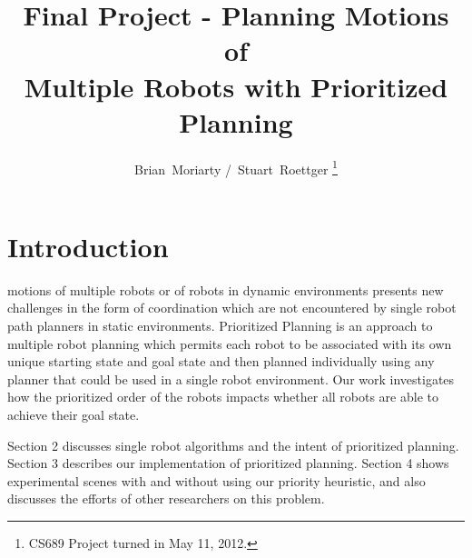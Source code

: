 \documentclass[12pt,journal,compsoc]{IEEEtran}
\begin{document}
%
\title{\large Final Project - Planning Motions of \\ Multiple Robots with Prioritized Planning}

\author{\small Brian~Moriarty
        /~Stuart~Roettger%
\thanks{CS689 Project turned in May 11, 2012.}}

\maketitle

\IEEEdisplaynotcompsoctitleabstractindextext


\IEEEpeerreviewmaketitle


\section{Introduction}
 motions of multiple robots or of robots in dynamic environments presents new challenges in the form of coordination which are not encountered by single robot path planners in static environments. Prioritized Planning is an approach to multiple robot planning which permits each robot to be associated with its own unique starting state and goal state and then planned individually using any planner that could be used in a single robot environment. Our work investigates how the prioritized order of the robots impacts whether all robots are able to achieve their goal state. 
\par
Section 2 discusses single robot algorithms and the intent of prioritized planning. Section 3 describes our implementation of prioritized planning. Section 4 shows experimental scenes with and without using our priority heuristic, and also discusses the efforts of other researchers on this problem.
\end{document}

